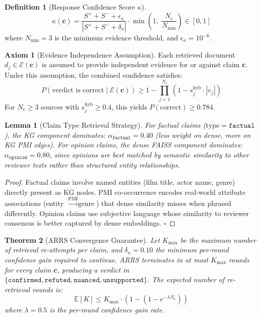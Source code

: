 \documentclass[12pt,a4paper]{article}
\theoremstyle{definition}
\newtheorem{definition}{Definition}[section]
\newtheorem{axiom}{Axiom}[section]
\theoremstyle{plain}
\newtheorem{theorem}{Theorem}[section]
\newtheorem{lemma}[theorem]{Lemma}
\theoremstyle{remark}
\newcommand{\EE}{\mathbb{E}}
\begin{document}
\begin{definition}[Response Confidence Score $\kappa$]
\[
  \kappa(\mathbf{c}) = \frac{S^+ + S^- + \epsilon_\kappa}{|{S^+ + S^- + 
  \delta_\nu}|} \cdot \min\!\left(1,\; \frac{N_e}{N_{\min}}\right)
  \in [0,1]
\]
where $N_{\min} = 3$ is the minimum evidence threshold, and 
$\epsilon_\kappa = 10^{-6}$.
\end{definition}

\begin{axiom}[Evidence Independence Assumption]
\label{ax:evidence_independence}
Each retrieved document $d_j \in \mathcal{E}(\mathbf{c})$ is assumed to provide 
independent evidence for or against claim $\mathbf{c}$. Under this assumption, 
the combined confidence satisfies:
\[
  P(\text{verdict is correct} \mid \mathcal{E}(\mathbf{c})) \ge 
  1 - \prod_{j=1}^{N_e} (1 - s_j^{\text{hyb}} \cdot |v_j|)
\]
For $N_e \ge 3$ sources with $s_j^{\text{hyb}} \ge 0.4$, this yields 
$P(\text{correct}) \ge 0.784$.
\end{axiom}

\begin{lemma}[Claim Type Retrieval Strategy]
\label{lem:claim_type}
For factual claims ($\text{type} = \mathtt{factual}$), the KG component 
dominates: $\alpha_{\mathtt{factual}} = 0.40$ (less weight on dense, more 
on KG PMI edges). For opinion claims, the dense FAISS component dominates: 
$\alpha_{\mathtt{opinion}} = 0.80$, since opinions are best matched by 
semantic similarity to other reviewer texts rather than structured entity 
relationships.
\end{lemma}

\begin{proof}
Factual claims involve named entities (film title, actor name, genre) 
directly present as KG nodes. PMI co-occurrence encodes real-world attribute 
associations (entity $\xrightarrow{\text{PMI}} \text{genre}$) that dense 
similarity misses when phrased differently. Opinion claims use subjective 
language whose similarity to reviewer consensus is better captured by 
dense embeddings. $\square$
\end{proof}

\begin{theorem}[ARRS Convergence Guarantee]
\label{thm:arrs_convergence}
Let $K_{\max}$ be the maximum number of retrieval re-attempts per claim, and 
$\delta_\kappa = 0.10$ the minimum per-round confidence gain required to 
continue. ARRS terminates in at most $K_{\max}$ rounds for every claim $\mathbf{c}$, 
producing a verdict in $\{\mathtt{confirmed}, \mathtt{refuted}, \mathtt{nuanced}, 
\mathtt{unsupported}\}$. The expected number of re-retrieval rounds is:
\[
  \EE[K] \le K_{\max} \cdot \left(1 - (1 - e^{-\lambda N_e})\right)
\]
where $\lambda = 0.5$ is the per-round confidence gain rate.
\end{theorem}
\end{document}
